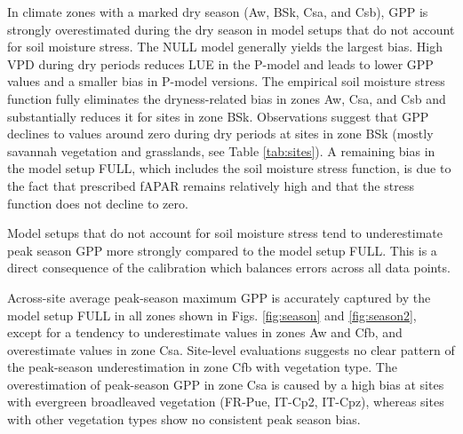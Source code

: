 \documentclass{myreport}
\begin{document}
In climate zones with a marked dry season (Aw, BSk, Csa, and Csb), GPP is strongly overestimated during the dry season in model setups that do not account for soil moisture stress. The NULL model generally yields the largest bias. High VPD during dry periods reduces LUE in the P-model and leads to lower GPP values and a smaller bias in P-model versions. The empirical soil moisture stress function fully eliminates the dryness-related bias in zones Aw, Csa, and Csb and substantially reduces it for sites in zone BSk. Observations suggest that GPP declines to values around zero during dry periods at sites in zone BSk (mostly savannah vegetation and grasslands, see Table \ref{tab:sites}). A remaining bias in the model setup FULL, which includes the soil moisture stress function, is due to the fact that prescribed fAPAR remains relatively high and that the stress function does not decline to zero.

Model setups that do not account for soil moisture stress tend to underestimate peak season GPP more strongly compared to the model setup FULL. This is a direct consequence of the calibration which balances errors across all data points.

Across-site average peak-season maximum GPP is accurately captured by the model setup FULL in all zones shown in Figs. \ref{fig:season} and \ref{fig:season2}, except for a tendency to underestimate values in zones Aw and Cfb, and overestimate values in zone Csa. Site-level evaluations suggests no clear pattern of the peak-season underestimation in zone Cfb with vegetation type. The overestimation of peak-season GPP in zone Csa is caused by a high bias at sites with evergreen broadleaved vegetation (FR-Pue, IT-Cp2, IT-Cpz), whereas sites with other vegetation types show no consistent peak season bias. 
\end{document}
